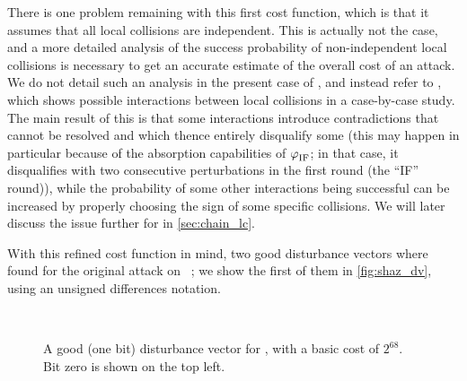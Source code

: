 There is one problem remaining with this first cost function, which is that it assumes that all local collisions are independent. This is actually not the case, and a more detailed analysis of
the success probability of non-independent local collisions is necessary to get an accurate estimate of the overall cost of an attack. We do not detail such an analysis in the present case
of \shazero, and instead refer to \cite[Chapter 5]{algocrypt}, which shows possible interactions between local collisions in a case-by-case study. The main result of this is that
some interactions introduce contradictions that cannot be resolved and which thence entirely disqualify some \dvs (this may happen in particular because of the absorption capabilities
of $\operatorname{\varphi}_\text{IF}$; in that case, it disqualifies \dvs with two consecutive perturbations in the first round (the ``IF'' round)),
while the probability of some other interactions being successful can be increased by properly choosing the sign of some specific collisions. We will later discuss
the issue further for \shaone in \autoref{sec:chain_lc}.

With this refined cost function in mind, two good disturbance vectors where found for the original attack on \shazero~\cite{DBLP:conf/crypto/ChabaudJ98}; we show the first of them in
\autoref{fig:shaz_dv}, using an unsigned differences notation.

\begin{figure}[ht]
\begin{center}
\nodiff \nodiff \nodiff \onediff \nodiff \nodiff \nodiff \nodiff \nodiff \nodiff \nodiff \onediff \nodiff \nodiff \onediff \nodiff \nodiff \nodiff \nodiff \nodiff
\nodiff \nodiff \onediff \nodiff \nodiff \nodiff \nodiff \onediff \onediff \nodiff \onediff \onediff \nodiff \onediff \onediff \onediff \onediff \onediff \onediff \nodiff\\

\onediff \onediff \nodiff \onediff \nodiff \nodiff \onediff \nodiff \nodiff \nodiff \nodiff \onediff \nodiff \onediff \nodiff \onediff \nodiff \nodiff \onediff \nodiff
\onediff \nodiff \onediff \nodiff \nodiff \nodiff \onediff \nodiff \onediff \onediff \onediff \nodiff \nodiff \onediff \onediff \nodiff \nodiff \nodiff \nodiff \nodiff
\end{center}
\caption[A good (one bit) disturbance vector for \shazero.]{A good (one bit) disturbance vector for \shazero, with a basic cost of $2^{68}$. Bit zero is shown on the top left.\label{fig:shaz_dv}}
\end{figure}

